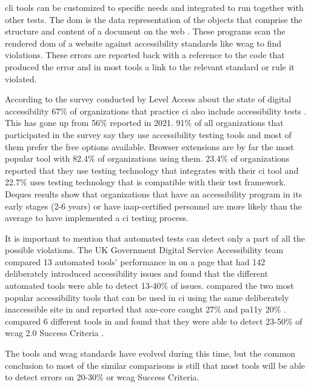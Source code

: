 \documentclass{master_thesis}
\begin{document}
\ac{cli} tools can be customized to specific needs and integrated to run together with other tests. The \ac{dom} is the data representation of the objects that comprise the structure and content of a document on the web \citep{MDN2023}. These programs scan the rendered \ac{dom} of a website against accessibility standards like \ac{wcag} to find violations. These errors are reported back with a reference to the code that produced the error and in most tools a link to the relevant standard or rule it violated.

According to the survey conducted by Level Access about the state of digital accessibility 67\% of organizations that practice \ac{ci} also include accessibility tests \citep{LevelAccess}. This has gone up from 56\% reported in 2021. 91\% of all organizations that participated in the survey say they use accessibility testing tools and most of them prefer the free options available. Browser extensions are by far the most popular tool with 82.4\% of organizations using them. 23.4\% of organizations reported that they use testing technology that integrates with their \ac{ci} tool and 22.7\% uses testing technology that is compatible with their test framework. Deques results show that organizations that have an accessibility program in its early stages (2-6 years) or have \ac{iaap}-certified personnel are more likely than the average to have implemented a \ac{ci} testing process.

It is important to mention that automated tests can detect only a part of all the possible violations. The UK Government Digital Service Accessibility team compared 13 automated tools' performance in \citeyear{GAT2018} on a page that had 142 deliberately introduced accessibility issues and found that the different automated tools were able to detect 13-40\% of issues. \citeauthor{Abbott2021} compared the two most popular accessibility tools that can be used in \ac{ci} using the same deliberately inaccessible site in \citeyear{Abbott2021} and reported that axe-core caught 27\% and pa11y 20\% \citep{Abbott2021}. \citeauthor{Vigo2013} compared 6 different tools in \citeyear{Vigo2013} and found that they were able to detect 23-50\% of  \ac{wcag} 2.0 Success Criteria \citep{GAT2018, Abbott2021, Vigo2013}.

The tools and \ac{wcag} standards have evolved during this time, but the common conclusion to most of the similar comparisons is still that most tools will be able to detect errors on 20-30\% or \ac{wcag} Success Criteria. 
\end{document}
